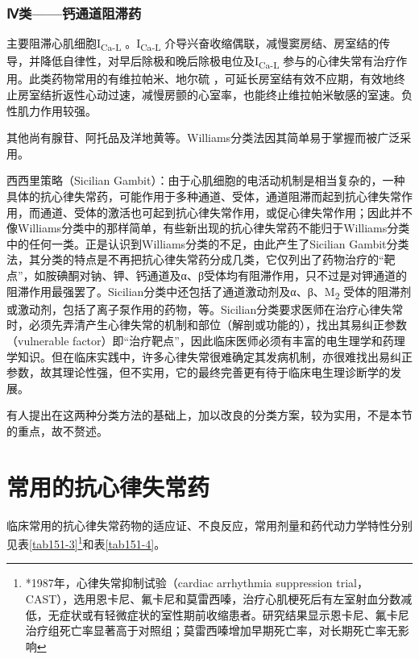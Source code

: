 \subsubsection{Ⅳ类------钙通道阻滞药}

主要阻滞心肌细胞I\textsubscript{Ca-L} 。I\textsubscript{Ca-L}
介导兴奋收缩偶联，减慢窦房结、房室结的传导，并降低自律性，对早后除极和晚后除极电位及I\textsubscript{Ca-L}
参与的心律失常有治疗作用。此类药物常用的有维拉帕米、地尔硫{}
，可延长房室结有效不应期，有效地终止房室结折返性心动过速，减慢房颤的心室率，也能终止维拉帕米敏感的室速。负性肌力作用较强。

其他尚有腺苷、阿托品及洋地黄等。Williams分类法因其简单易于掌握而被广泛采用。

西西里策略（Sicilian
Gambit）：由于心肌细胞的电活动机制是相当复杂的，一种具体的抗心律失常药，可能作用于多种通道、受体，通道阻滞而起到抗心律失常作用，而通道、受体的激活也可起到抗心律失常作用，或促心律失常作用；因此并不像Williams分类中的那样简单，有些新出现的抗心律失常药不能归于Williams分类中的任何一类。正是认识到Williams分类的不足，由此产生了Sicilian
Gambit分类法，其分类的特点是不再把抗心律失常药分成几类，它仅列出了药物治疗的“靶点”，如胺碘酮对钠、钾、钙通道及α、β受体均有阻滞作用，只不过是对钾通道的阻滞作用最强罢了。Sicilian分类中还包括了通道激动剂及α、β、M\textsubscript{2}
受体的阻滞剂或激动剂，包括了离子泵作用的药物，等。Sicilian分类要求医师在治疗心律失常时，必须先弄清产生心律失常的机制和部位（解剖或功能的），找出其易纠正参数（vulnerable
factor）即“治疗靶点”，因此临床医师必须有丰富的电生理学和药理学知识。但在临床实践中，许多心律失常很难确定其发病机制，亦很难找出易纠正参数，故其理论性强，但不实用，它的最终完善更有待于临床电生理诊断学的发展。

有人提出在这两种分类方法的基础上，加以改良的分类方案，较为实用，不是本节的重点，故不赘述。

\protect\hypertarget{text00421.html}{}{}

\section{常用的抗心律失常药}

临床常用的抗心律失常药物的适应证、不良反应，常用剂量和药代动力学特性分别见表\ref{tab151-3}\footnote{*1987年，心律失常抑制试验（cardiac arrhythmia suppression trial，CAST），选用恩卡尼、氟卡尼和莫雷西嗪，治疗心肌梗死后有左室射血分数减低，无症状或有轻微症状的室性期前收缩患者。研究结果显示恩卡尼、氟卡尼治疗组死亡率显著高于对照组；莫雷西嗪增加早期死亡率，对长期死亡率无影响}和表\ref{tab151-4}。

